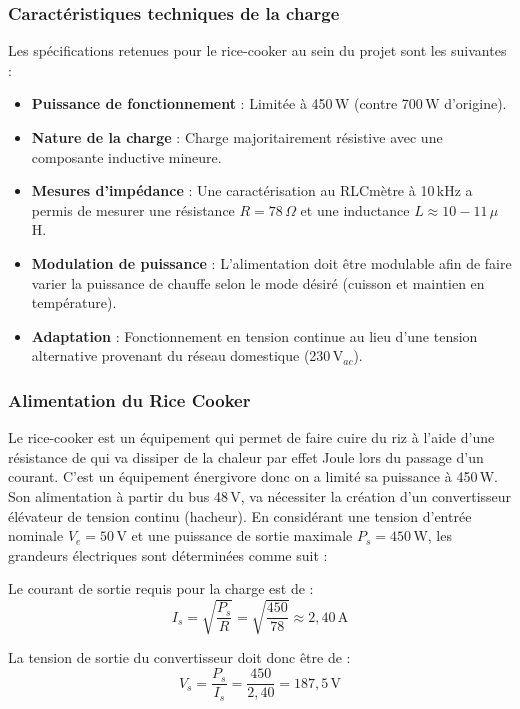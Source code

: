 \subsubsection{Caractéristiques techniques de la charge}
Les spécifications retenues pour le rice-cooker au sein du projet sont les suivantes :
\begin{itemize}
    \item \textbf{Puissance de fonctionnement} : Limitée à 450\,W (contre 700\,W d'origine).
    \item \textbf{Nature de la charge} : Charge majoritairement résistive avec une composante inductive mineure.
    \item \textbf{Mesures d'impédance} : Une caractérisation au RLCmètre à 10\,kHz a permis de mesurer une résistance $R = 78\,\Omega$ et une inductance $L \approx 10-11\,\mu$H.
    \item \textbf{Modulation de puissance} : L'alimentation doit être modulable afin de faire varier la puissance de chauffe selon le mode désiré (cuisson et maintien en température).
    \item \textbf{Adaptation} : Fonctionnement en tension continue au lieu d’une tension alternative provenant du réseau domestique (230\,V$_{ac}$).

\end{itemize}

\subsubsection{Alimentation du Rice Cooker}
Le rice-cooker est un équipement qui permet de faire cuire du riz à l’aide d’une résistance de qui va dissiper de la chaleur par effet Joule lors du passage d’un courant. C’est un équipement énergivore donc on a limité sa puissance à 450\,W. Son alimentation à partir du bus 48\,V, va nécessiter la création d’un convertisseur élévateur de tension continu (hacheur).
En considérant une tension d'entrée nominale $V_e = 50$\,V et une puissance de sortie maximale $P_s = 450$\,W, les grandeurs électriques sont déterminées comme suit :

Le courant de sortie requis pour la charge est de :
\begin{equation*}
    I_s = \sqrt{\frac{P_s}{R}} = \sqrt{\frac{450}{78}} \approx 2,40\,\text{A}
\end{equation*}

La tension de sortie du convertisseur doit donc être de :
\begin{equation*}
    V_s = \frac{P_s}{I_s} = \frac{450}{2,40} = 187,5\,\text{V}
\end{equation*}

